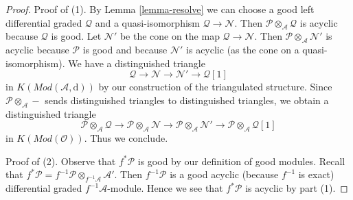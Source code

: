\documentclass[10pt,a4paper]{amsart}
\theoremstyle{plain}
\theoremstyle{definition}
\theoremstyle{remark}
\numberwithin{equation}{subsection}
\begin{document}
\begin{proof}
Proof of (1). By Lemma \ref{lemma-resolve} we can choose a good
left differential graded $\mathcal{Q}$ and a quasi-isomorphism
$\mathcal{Q} \to \mathcal{N}$. Then
$\mathcal{P} \otimes_\mathcal{A} \mathcal{Q}$
is acyclic because $\mathcal{Q}$ is good.
Let $\mathcal{N}'$ be the cone on the map
$\mathcal{Q} \to \mathcal{N}$. Then
$\mathcal{P} \otimes_\mathcal{A} \mathcal{N}'$ is acyclic because
$\mathcal{P}$ is good and because $\mathcal{N}'$ is acyclic
(as the cone on a quasi-isomorphism). We have a distinguished
triangle
$$
\mathcal{Q} \to \mathcal{N} \to \mathcal{N}' \to \mathcal{Q}[1]
$$
in $K(\textit{Mod}(\mathcal{A}, \text{d}))$ by our construction
of the triangulated structure. Since
$\mathcal{P} \otimes_\mathcal{A} -$ sends distinguished
triangles to distinguished triangles, we obtain a distinguished
triangle
$$
\mathcal{P} \otimes_\mathcal{A} \mathcal{Q} \to
\mathcal{P} \otimes_\mathcal{A} \mathcal{N} \to
\mathcal{P} \otimes_\mathcal{A} \mathcal{N}' \to
\mathcal{P} \otimes_\mathcal{A} \mathcal{Q}[1]
$$
in $K(\textit{Mod}(\mathcal{O}))$. Thus we conclude.

\medskip\noindent
Proof of (2). Observe that $f^*\mathcal{P}$ is good by our definition
of good modules. Recall that
$f^*\mathcal{P} = f^{-1}\mathcal{P} \otimes_{f^{-1}\mathcal{A}} \mathcal{A}'$.
Then $f^{-1}\mathcal{P}$ is a good acyclic (because $f^{-1}$ is exact)
differential graded $f^{-1}\mathcal{A}$-module. Hence
we see that $f^*\mathcal{P}$ is acyclic by part (1).
\end{proof}
\end{document}
